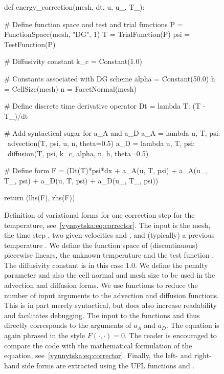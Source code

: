 \begin{figure}
    \begin{python}
def energy_correction(mesh, dt, u, u_, T_):

    # Define function space and test and trial functions
    P = FunctionSpace(mesh, "DG", 1)
    T = TrialFunction(P)
    psi = TestFunction(P)

    # Diffusivity constant
    k_c = Constant(1.0)

    # Constants associated with DG scheme
    alpha = Constant(50.0)
    h = CellSize(mesh)
    n = FacetNormal(mesh)

    # Define discrete time derivative operator
    Dt = lambda T: (T - T_)/dt

    # Add syntactical sugar for a_A and a_D
    a_A = lambda u, T, psi: \
              advection(T, psi, u, n, theta=0.5)
    a_D = lambda u, T, psi: \
              diffusion(T, psi, k_c, alpha,
                        n, h, theta=0.5)

    # Define form
    F = (Dt(T)*psi*dx
         + a_A(u, T, psi) + a_A(u_, T_, psi)
         + a_D(u, T, psi) + a_D(u_, T_, psi))

    return (lhs(F), rhs(F))
    \end{python}
    \caption{Definition of variational forms for one correction step
      for the temperature, see~\eqref{vynnytska:eq:corrector}. The
      input is the mesh, the time step \emp{dt}, two given velocities
      \emp{u} and \emp{u\_}, and (typically) a previous temperature
      \emp{T\_}. We define the function space of (discontinuous)
      piecewise linears, the unknown temperature \emp{T} and the test
      function \emp{psi}. The diffusivity constant \emp{k\_c} is in
      this case $1.0$. We define the penalty parameter \emp{alpha}
      and also the cell normal \emp{n} and mesh size \emp{h} to be
      used in the advection and diffusion forms.
%
      We use  functions to reduce the number of input
      arguments to the advection and diffusion functions. This is in
      part merely syntactical, but does also increase readability and
      facilitates debugging. The input to the functions \emp{a\_A}
      and \emp{a\_D} thus directly corresponds to the arguments of
      $a_A$ and $a_D$.
%
      The equation is again phrased in the style $F(\cdot, \cdot) =
      0$. The reader is encouraged to compare the code with the
      mathematical formulation of the equation,
      see~\eqref{vynnytska:eq:corrector}. Finally, the left- and
      right-hand side forms are extracted using the UFL
      functions \emp{lhs} and \emp{rhs}.}
  \label{vynnytska:fig:temperaturecorrection}
\end{figure}

